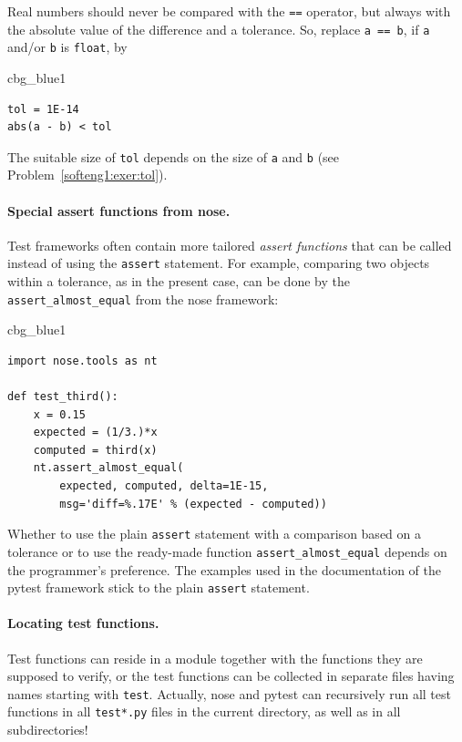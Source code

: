 \documentclass[%
oneside,                 %
final,                   %
10pt]{article}
\newenvironment{_cod_tight}[1]{
   \def\FrameCommand{\colorbox{#1}}
   \FrameRule0.6pt\MakeFramed {\FrameRestore}\vskip3mm}
   {\vskip0mm\endMakeFramed}
\newenvironment{cod}[1]{
\bgroup\rmfamily
\fboxsep=0mm\relax
\begin{_cod_tight}{#1}
\list{}{\parsep=-2mm\parskip=0mm\topsep=0pt\leftmargin=2mm
\rightmargin=2\leftmargin\leftmargin=4pt\relax}
\item\relax}
{\endlist\end{_cod_tight}\egroup}
\newenvironment{notice_mdfboxadmon}[1][]{
\begin{notice_mdfboxmdframed}[frametitle=#1]
}
{
\end{notice_mdfboxmdframed}
}
\begin{document}
\begin{notice_mdfboxadmon}
Real numbers should never be compared with the \texttt{==} operator, but always
with the absolute value of the difference and a tolerance.
So, replace \texttt{a == b}, if \texttt{a} and/or \texttt{b} is \texttt{float}, by

\begin{cod}{cbg_blue1}\begin{Verbatim}[numbers=none,fontsize=\fontsize{9pt}{9pt},baselinestretch=0.95,xleftmargin=2mm]
tol = 1E-14
abs(a - b) < tol
\end{Verbatim}
\end{cod}
\noindent
The suitable size of \texttt{tol} depends on the size of \texttt{a} and \texttt{b}
(see Problem~\ref{softeng1:exer:tol}).
\end{notice_mdfboxadmon}



\paragraph{Special assert functions from nose.}
Test frameworks often contain more tailored
\emph{assert functions} that can be called instead of using the \texttt{assert}
statement. For example, comparing two objects within
a tolerance, as in the present
case, can be done by the \Verb!assert_almost_equal! from the nose
framework:

\begin{cod}{cbg_blue1}\begin{Verbatim}[numbers=none,fontsize=\fontsize{9pt}{9pt},baselinestretch=0.95,xleftmargin=2mm]
import nose.tools as nt

def test_third():
    x = 0.15
    expected = (1/3.)*x
    computed = third(x)
    nt.assert_almost_equal(
        expected, computed, delta=1E-15,
        msg='diff=%.17E' % (expected - computed))
\end{Verbatim}
\end{cod}
\noindent

Whether to use the plain \texttt{assert} statement with a comparison based on
a tolerance or to use the ready-made function \Verb!assert_almost_equal!
depends on the programmer's preference. The examples used in the
documentation of the pytest framework stick to the plain \texttt{assert}
statement.

\paragraph{Locating test functions.}
Test functions can reside in a module together with the functions they
are supposed to verify, or the test functions can be collected in
separate files having names starting with \texttt{test}. Actually,
nose and pytest can recursively run all test functions
in all \texttt{test*.py}
files in the current directory, as well as in all subdirectories!
\end{document}
